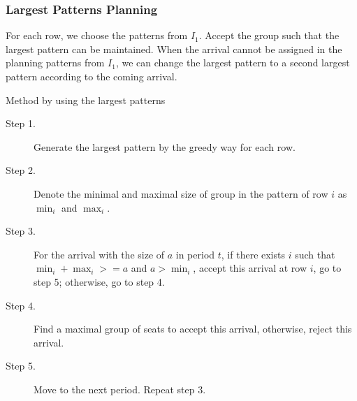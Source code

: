 

\subsubsection{Largest Patterns Planning}\label{largest_pattern}
For each row, we choose the patterns from $I_1$. Accept the group such that the largest pattern can be maintained. When the arrival cannot be assigned in the planning patterns from $I_1$, we can change the largest pattern to a second largest pattern according to the coming arrival.





\begin{algorithm}[H]\label{algo_largest}
  \caption{Method by using the largest patterns}
  \begin{description}
    \item[Step 1.] Generate the largest pattern by the greedy way for each row.
    \item[Step 2.] Denote the minimal and maximal size of group in the pattern of row $i$ as $\min_i$ and $\max_i$. 
    \item[Step 3.] For the arrival with the size of $a$ in period $t$, if there exists $i$ such that $\min_i + \max_i >= a$ and $a > \min_i$, accept this arrival at row $i$, go to step 5; otherwise, go to step 4.
    \item[Step 4.] Find a maximal group of seats to accept this arrival, otherwise, reject this arrival.
    \item[Step 5.] Move to the next period. Repeat step 3. 
  \end{description}
\end{algorithm}

